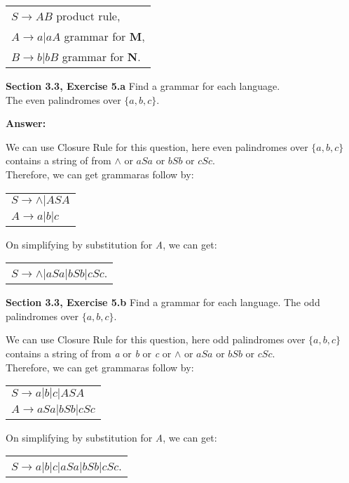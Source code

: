 \documentclass[12pt]{article}
\begin{document}
\begin{center}
\begin{tabular}{l}
$S \rightarrow AB$ product rule, \\
$A \rightarrow a | aA$ grammar for \textbf{M},\\
$B \rightarrow b | bB$ grammar for \textbf{N}. \\   
\end{tabular}
\end{center}

\textbf{Section 3.3, Exercise 5.a} Find a grammar for each language.\\
The even palindromes over $\{a, b, c\}$.

\textbf{Answer:}

We can use Closure Rule for this question, here even palindromes over $\{a, b, c\}$ 
contains a string of from $\wedge$ or $aSa$ or $bSb$ or $cSc$.\\
Therefore, we can get grammaras follow by:
\begin{center}
\begin{tabular}{l}
$S \rightarrow \wedge|ASA$\\
$A \rightarrow a|b|c$\\
\end{tabular}
\end{center}

On simplifying by substitution for \textit{A}, we can get:
\begin{center}
\begin{tabular}{l}
$S \rightarrow \wedge|aSa|bSb|cSc$.
\end{tabular}
\end{center}

\textbf{Section 3.3, Exercise 5.b} Find a grammar for each language.
The odd palindromes over $\{a, b, c\}$.

We can use Closure Rule for this question, here odd palindromes over $\{a, b, c\}$ 
contains a string of from \textit{a} or \textit{b} or \textit{c} 
or $\wedge$ or $aSa$ or $bSb$ or $cSc$.\\
Therefore, we can get grammaras follow by:
\begin{center}
\begin{tabular}{l}
$S \rightarrow a|b|c|ASA$\\
$A \rightarrow aSa|bSb|cSc$\\
\end{tabular}
\end{center}

On simplifying by substitution for \textit{A}, we can get:
\begin{center}
\begin{tabular}{l}
$S \rightarrow a|b|c|aSa|bSb|cSc$.
\end{tabular}
\end{center}
\end{document}
